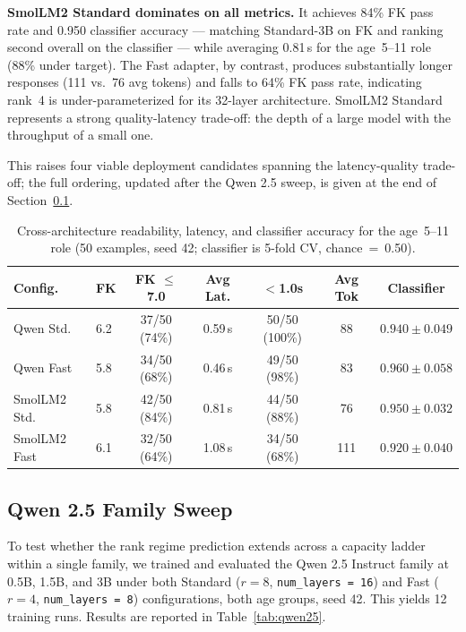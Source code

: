 \documentclass[AMA,Times1COL]{WileyNJDv5} %
\begin{document}
\textbf{SmolLM2 Standard dominates on all metrics.} It achieves 84\% FK pass rate and 0.950 classifier accuracy --- matching Standard-3B on FK and ranking second overall on the classifier --- while averaging 0.81\,s for the age~5--11 role (88\% under target). The Fast adapter, by contrast, produces substantially longer responses (111 vs.\ 76 avg tokens) and falls to 64\% FK pass rate, indicating rank~4 is under-parameterized for its 32-layer architecture. SmolLM2 Standard represents a strong quality-latency trade-off: the depth of a large model with the throughput of a small one.

This raises four viable deployment candidates spanning the latency-quality trade-off; the full ordering, updated after the Qwen 2.5 sweep, is given at the end of Section~\ref{sec:qwen25}.

\begin{table}[!t]
  \centering
  \caption{Cross-architecture readability, latency, and classifier accuracy for the age~5--11 role (50 examples, seed 42; classifier is 5-fold CV, chance~=~0.50).}
  \label{tab:crossarch}
  \footnotesize
  \begin{tabular}{llccccc}
    \hline
    Config. & FK & FK $\leq$7.0 & Avg Lat. & $<$1.0s & Avg Tok & Classifier \\
    \hline
    Qwen Std.    & 6.2 & 37/50 (74\%) & 0.59\,s & 50/50 (100\%) & 88  & $0.940 \pm 0.049$ \\
    Qwen Fast    & 5.8 & 34/50 (68\%) & 0.46\,s & 49/50 (98\%)  & 83  & $0.960 \pm 0.058$ \\
    SmolLM2 Std. & 5.8 & 42/50 (84\%) & 0.81\,s & 44/50 (88\%)  & 76  & $0.950 \pm 0.032$ \\
    SmolLM2 Fast & 6.1 & 32/50 (64\%) & 1.08\,s & 34/50 (68\%)  & 111 & $0.920 \pm 0.040$ \\
    \hline
  \end{tabular}
\end{table}

\subsection{Qwen 2.5 Family Sweep}\label{sec:qwen25}

To test whether the rank regime prediction extends across a capacity ladder within a single family, we trained and evaluated the Qwen 2.5 Instruct family at 0.5B, 1.5B, and 3B under both Standard ($r=8$, \texttt{num\_layers~=~16}) and Fast ($r=4$, \texttt{num\_layers~=~8}) configurations, both age groups, seed 42. This yields 12 training runs. Results are reported in Table~\ref{tab:qwen25}.
\end{document}
